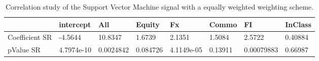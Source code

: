 \begin{table}[H]
\centering
\begin{tabular}{llllllll}
& intercept & All & Equity & Fx & Commo & FI & InClass \\ 
\hline 
Coefficient SR & -4.5644 & 10.8347 & 1.6739 & 2.1351 & 1.5084 & 2.5722 & 0.40884 \\ 
pValue SR & 4.7974e-10 & 0.0024842 & 0.084726 & 4.1149e-05 & 0.13911 & 0.00079883 & 0.66987 \\ 
\hline
\end{tabular}
\caption{Correlation study of the Support Vector Machine signal with a equally weighted weighting scheme.}
\label{SVM_EW_CORR}
\end{table}